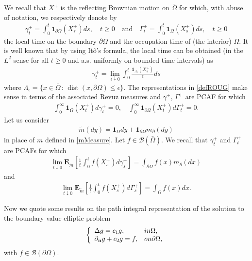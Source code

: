 \documentclass[11pt,a4paper]{article}
\begin{document}
We recall that $X^+$ is the reflecting Brownian motion on $\bar{\Omega}$ for which, with abuse of notation, we respectively denote by
\begin{align}
\gamma^+_t = \int_0^t \mathbf{1}_{\partial \Omega} (X^+_s) ds, \quad t\geq 0 \quad \textrm{and} \quad \Gamma^+_t = \int_0^t \mathbf{1}_{\Omega} (X^+_s) ds, \quad t\geq 0
\label{defROUG}
\end{align}
the local time on the boundary $\partial \Omega$ and the occupation time of (the interior) $\Omega$. It is well known that by using It\^{o}'s formula, the local time can be obtained (in the $L^2$ sense for all $t\geq 0$ and a.s. uniformly on bounded time intervals) as
\begin{align*}
\gamma^+_t = \lim_{\epsilon \downarrow 0} \int_0^t \frac{\mathbf{1}_{\Lambda_\epsilon}(X^+_s)}{\epsilon} ds
\end{align*}
where $\Lambda_\epsilon = \{x \in \bar{\Omega}\,:\, \operatorname{dist}(x, \partial \Omega) \leq  \epsilon\}$. The representations in \eqref{defROUG} make sense in terms of the associated Revuz measures and $\gamma^+$, $\Gamma^+$ are PCAF for which
\begin{align}
\int_0^\infty \mathbf{1}_{\Omega}(X^+_t) d\gamma^+_t = 0, \quad \int_0^\infty \mathbf{1}_{\partial \Omega}(X^+_t) d\Gamma^+_t = 0.
\label{defgammaGammaRigorous}
\end{align} 
Let us consider 
\begin{align}
\tilde{m}(dy) = \mathbf{1}_\Omega dy + \mathbf{1}_{\partial \Omega} m_\partial(dy)
\label{mMeasureTilde}
\end{align}
in place of $m$ defined in \eqref{mMeasure}. Let $f \in \mathcal{B}(\bar{\Omega})$. We recall that $\gamma^+_t$ and $\Gamma^+_t$ are PCAFs for which
\begin{align}
\label{limitPCAFgamma}
\lim_{t \downarrow 0} \mathbf{E}_{\tilde{m}} \left[ \frac{1}{t} \int_0^t f(X^+_s) d\gamma^+_s \right] = \int_{\partial \Omega} f(x) m_\partial(dx)
\end{align}
and
\begin{align}
\label{limitPCAFGamma}
\lim_{t \downarrow 0} \mathbf{E}_{\tilde{m}} \left[ \frac{1}{t} \int_0^t f(X^+_s) d\Gamma^+_s \right]  = \int_\Omega f(x) dx.
\end{align}

Now we quote some results on the path integral representation of the solution to the boundary value elliptic problem
\begin{equation}
\label{prob31}
\left\lbrace
\begin{array}{ll}
\displaystyle \Delta g = c_1 g , & \textrm{ in } \Omega,\\
\displaystyle \partial_{\bf n} g + c_2 g = f , &  \textrm{ on } \partial \Omega,
\end{array}
\right.
\end{equation}
with $f \in \mathcal{B}(\partial \Omega)$.
\end{document}

